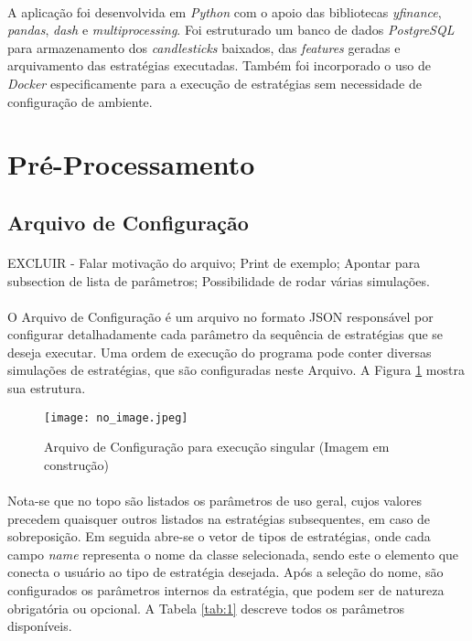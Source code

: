 \paragraph{} A aplicação foi desenvolvida em \textit{Python} com o apoio das bibliotecas \textit{yfinance}, \textit{pandas}, \textit{dash} e \textit{multiprocessing}. Foi estruturado um banco de dados \textit{PostgreSQL} para armazenamento dos \textit{candlesticks} baixados, das \textit{features} geradas e arquivamento das estratégias executadas. Também foi incorporado o uso de \textit{Docker} especificamente para a execução de estratégias sem necessidade de configuração de ambiente.

\section{Pré-Processamento}

\subsection{Arquivo de Configuração}
\paragraph{} EXCLUIR - Falar motivação do arquivo; Print de exemplo; Apontar para subsection de lista de parâmetros; Possibilidade de rodar várias simulações.

\paragraph{} O Arquivo de Configuração é um arquivo no formato JSON responsável por configurar detalhadamente cada parâmetro da sequência de estratégias que se deseja executar. Uma ordem de execução do programa pode conter diversas simulações de estratégias, que são configuradas neste Arquivo. A Figura \ref{fig:101} mostra sua estrutura.

\begin{figure}[h]
    \texttt{[image: no\_image.jpeg]}
    \centering
    \caption{Arquivo de Configuração para execução singular (Imagem em construção)}
    \label{fig:101}
\end{figure}

\paragraph{} Nota-se que no topo são listados os parâmetros de uso geral, cujos valores precedem quaisquer outros listados na estratégias subsequentes, em caso de sobreposição. Em seguida abre-se o vetor de tipos de estratégias, onde cada campo \textit{name} representa o nome da classe selecionada, sendo este o elemento que conecta o usuário ao tipo de estratégia desejada. Após a seleção do nome, são configurados os parâmetros internos da estratégia, que podem ser de natureza obrigatória ou opcional. A Tabela \ref{tab:1} descreve todos os parâmetros disponíveis.

